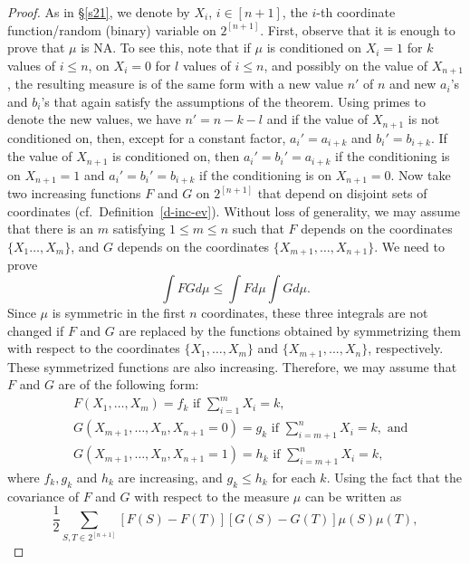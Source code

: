 \documentclass[10pt,reqno]{amsart}
\theoremstyle{plain}
\theoremstyle{definition}
\theoremstyle{remark}
\begin{document}
\begin{proof}
As in \S \ref{s21}, we denote by $X_i$, $i\in [n+1]$, the $i$-th coordinate
function/random (binary) variable on $2^{[n+1]}$. First, observe that it is 
enough to prove that $\mu$ is  NA. To see this, note
that if $\mu$ is conditioned on 
$X_i=1$ for $k$ values of $i\leq n$, on $X_i=0$ for
$l$ values of $i\leq n$, and possibly on the value of $X_{n+1}$, the  
resulting measure is
of the same form with a new value $n'$ of $n$ and new $a_i$'s and $b_i$'s  
that again satisfy the assumptions of the
theorem. Using primes to denote the new values, we have $n'=n-k-l$ and if the  
value of $X_{n+1}$ is not conditioned on,
then, except for a constant factor, $a_i'=a_{i+k}$ and $b_i'=b_{i+k}$. If
the value of $X_{n+1}$ is conditioned on, then $a_i'=b_i'=a_{i+k}$ if  
the conditioning is on
$X_{n+1}=1$ and $a_i'=b_i'=b_{i+k}$ if the conditioning is on $X_{n+1} =0$.
Now take two increasing functions $F$ and $G$ on $2^{[n+1]}$ that  depend on 
disjoint sets of coordinates (cf.~Definition~\ref{d-inc-ev}). Without loss of 
generality, we may assume that there  is an $m$ satisfying
$1\leq m\leq n$ such that $F$ depends on the coordinates $\{X_1\ldots,X_m \}$, 
and $G$ depends on the
coordinates $\{X_{m+1},\ldots,X_{n+1}\}$. We need to prove
\begin{equation}\label{cna1}
\int FGd\mu\leq\int Fd\mu\int G d\mu.
\end{equation}
Since $\mu$ is symmetric in the first $n$ coordinates, these three  
integrals are not
changed if $F$ and $G$ are replaced by the functions obtained by  
symmetrizing them with
respect to the coordinates $\{X_1,\ldots,X_m\}$ and $\{X_{m+1},...,X_n\}$, 
respectively. These symmetrized
functions are also increasing. Therefore, we may assume that $F$ and  $G$ are 
of the following form:
\begin{equation*}
\begin{split}
&F(X_1,\ldots,X_m)=f_k\text{ if }\sum_{i=1}^mX_i =k,\\
&G(X_{m+1},\ldots,X_n,X_{n+1}=0)=g_k\text{ if }\sum_{i=m+1}^nX_i =k,
\text{ and}\\
&G(X_{m+1},\ldots,X_n,X_{n+1}=1)=h_k\text{ if }\sum_{i=m+1}^nX_i =k,
\end{split}
\end{equation*}
where $f_k,g_k$ and $h_k$ are increasing, and $g_k\leq h_k$ for each  $k$.
Using the fact that the covariance of $F$ and $G$ with respect to the  
measure $\mu$
can be written as
$$\frac 12\sum_{S,T\in 2^{[n+1]}}[F(S)-F(T)][G(S)-G(T)]\mu(S)\mu(T),$$

\end{proof}
\end{document}
